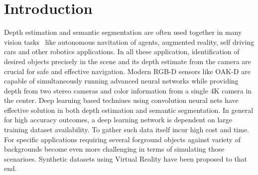 \documentclass[review]{cvpr}
\begin{document}
 

\section{Introduction}
Depth estimation and semantic segmentation are often used together in many vision tasks~\cite{lin2018joint} like 
autonomous navitation of agents, augmented reality, self driving cars and other robotics applications. In all these application,
identification of desired objects precisely in the scene and its depth estimate from the camera are crucial for safe and effective
navigation. Modern RGB-D sensors like OAK-D are capable of simultaneously running advanced neural networks while providing depth 
from two stereo cameras and color information from a single 4K camera in the center. Deep learning based techniues using convolution
neural nets have effective solution in both depth estimation and semantic segmentation. In general for high accuracy outcomes, a
deep learning network is dependent on large training dataset availability. To gather such data itself incur high cost and time.
For specific applications requiring several forground objects against variety of backgrounds become even more challenging in terms
of simulating those scenarioes. Synthetic datasets using Virtual Reality have been proposed to that end.
\end{document}
